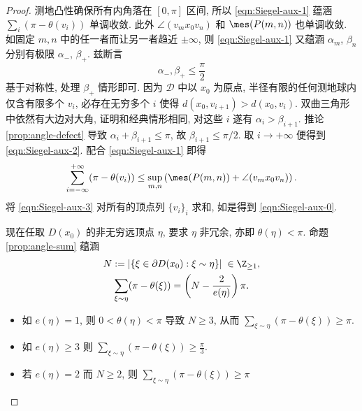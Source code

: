 \begin{proof}
	测地凸性确保所有内角落在 $[0, \pi]$ 区间, 所以 \eqref{eqn:Siegel-aux-1} 蕴涵 $\sum_i (\pi - \theta(v_i))$ 单调收敛. 此外 $\angle (v_m x_0 v_n)$ 和 $\mes(P(m,n))$ 也单调收敛. 如固定 $m,n$ 中的任一者而让另一者趋近 $\pm\infty$, 则 \eqref{eqn:Siegel-aux-1} 又蕴涵 $\alpha_m$, $\beta_n$ 分别有极限 $\alpha_-$, $\beta_+$. 兹断言
	\begin{equation}\label{eqn:Siegel-aux-2}
		\alpha_-, \beta_+ \leq \frac{\pi}{2}
	\end{equation}
	基于对称性, 处理 $\beta_+$ 情形即可. 因为 $\mathcal{D}$ 中以 $x_0$ 为原点, 半径有限的任何测地球内仅含有限多个 $v_i$, 必存在无穷多个 $i$ 使得 $d(x_0, v_{i+1}) > d(x_0, v_i)$. 双曲三角形中依然有大边对大角, 证明和经典情形相同, 对这些 $i$ 遂有 $\alpha_i > \beta_{i+1}$. 推论 \ref{prop:angle-defect} 导致 $\alpha_i + \beta_{i+1} \leq \pi$, 故 $\beta_{i+1} \leq \pi/2$. 取 $i \to +\infty$ 便得到 \eqref{eqn:Siegel-aux-2}. 配合 \eqref{eqn:Siegel-aux-1} 即得
	\begin{equation}\label{eqn:Siegel-aux-3}
		\sum_{i = -\infty}^{+\infty} (\pi - \theta(v_i)) \leq \sup_{m,n} \left(\mes(P(m,n)) + \angle(v_m x_0 v_n) \right).
	\end{equation}
	将 \eqref{eqn:Siegel-aux-3} 对所有的顶点列 $\{v_i\}_i$ 求和, 如是得到 \eqref{eqn:Siegel-aux-0}.
	
	现在任取 $D(x_0)$ 的非无穷远顶点 $\eta$, 要求 $\eta$ 非冗余, 亦即 $\theta(\eta) < \pi$. 命题 \ref{prop:angle-sum} 蕴涵
	\begin{equation*}\begin{gathered}
		N := \left| \left\{ \xi \in \partial D(x_0): \xi \sim \eta \right\}\right| \; \in \Z_{\geq 1}, \\
		\sum_{\xi \sim \eta} (\pi - \theta(\xi)) = \left(N - \frac{2}{e(\eta)}\right) \pi.
	\end{gathered}\end{equation*}
	\begin{itemize}
		\item 如 $e(\eta) = 1$, 则 $0 < \theta(\eta) < \pi$ 导致 $N \geq 3$, 从而 $\sum_{\xi \sim \eta} (\pi - \theta(\xi)) \geq \pi$.
		\item 如 $e(\eta) \geq 3$ 则 $\sum_{\xi \sim \eta} (\pi - \theta(\xi)) \geq \frac{\pi}{3}$.
		\item 若 $e(\eta) = 2$ 而 $N \geq 2$, 则 $\sum_{\xi \sim \eta} (\pi - \theta(\xi)) \geq \pi$
		

\end{itemize}
\end{proof}
